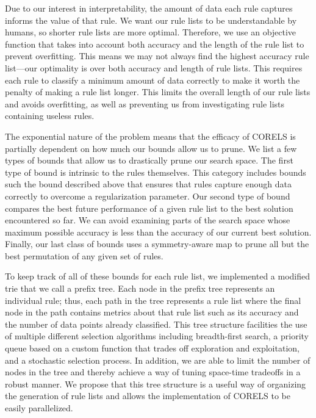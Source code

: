 Due to our interest in interpretability, the amount of data each rule captures informs the value of that rule. 
We want our rule lists to be understandable by humans, so shorter rule lists are more optimal. 
Therefore, we use an objective function that takes into account both accuracy and the length of the rule list to prevent overfitting. 
This means we may not always find the highest accuracy rule list---our optimality is over both accuracy and length of rule lists.
This requires each rule to classify a minimum amount of data correctly to make it worth the penalty of making a rule list longer. 
This limits the overall length of our rule lists and avoids overfitting, as well as preventing us from investigating rule lists containing useless rules.

The exponential nature of the problem means that the efficacy of CORELS is partially dependent on how much our bounds allow us to prune. 
We list a few types of bounds that allow us to drastically prune our search space. 
The first type of bound is intrinsic to the rules themselves.
This category includes bounds such the bound described above that ensures that rules capture enough data correctly to overcome a regularization parameter. 
Our second type of bound compares the best future performance of a given rule list to the best solution encountered so far. 
We can avoid examining parts of the search space whose maximum possible accuracy is less than the accuracy of our current best solution. 
Finally, our last class of bounds uses a symmetry-aware map to prune all but the best permutation of any given set of rules.

To keep track of all of these bounds for each rule list, we implemented a modified trie that we call a prefix tree. 
Each node in the prefix tree represents an individual rule; thus, each path in the tree represents a rule list where the final node in the path contains metrics about that rule list such as its accuracy and the number of data points already classified.
This tree structure facilities the use of multiple different selection algorithms including breadth-first search, a priority queue based on a custom function that trades off exploration and exploitation, and a stochastic selection process. 
In addition, we are able to limit the number of nodes in the tree and thereby achieve a way of tuning space-time tradeoffs in a robust manner. 
We propose that this tree structure is a useful way of organizing the generation of rule lists and allows the implementation of CORELS to be easily parallelized.


